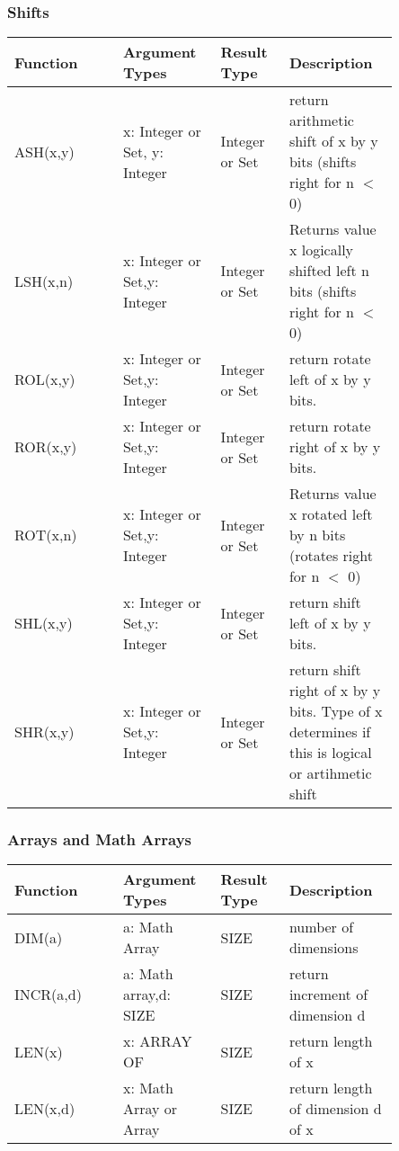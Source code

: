 \documentclass[a4wide,11pt]{article}
\begin{document}
\subsubsection{Shifts}
\begin{longtable}{|p{0.25\linewidth}|p{0.2\linewidth}|p{0.15\linewidth}|p{0.25\linewidth}|}
\hline
Function & Argument Types & Result Type & Description \\
\hline\hline
\endhead
ASH(x,y) & x: Integer or Set, y: Integer & Integer or Set & return arithmetic shift of x by y bits (shifts right for n $<$ 0)\\
LSH(x,n) & x: Integer or Set,\newline y: Integer & Integer or Set & Returns value x logically shifted left n bits (shifts right for n $<$ 0) \\
ROL(x,y) & x: Integer or Set,\newline y: Integer & Integer or Set & return rotate left of x by y bits. \\
ROR(x,y) & x: Integer or Set,\newline  y: Integer & Integer or Set & return rotate right of x by y bits. \\
ROT(x,n) & x: Integer or Set,\newline  y: Integer & Integer or Set & Returns value x rotated left by  n bits (rotates right for n $<$ 0) \\
SHL(x,y) & x: Integer or Set,\newline  y: Integer & Integer or Set & return shift left of x by y bits. \\
SHR(x,y) & x: Integer or Set,\newline  y: Integer & Integer or Set & return shift right of x by y bits. Type of x determines if this is logical or artihmetic shift\\
\hline
\end{longtable}

\subsubsection{Arrays and Math Arrays}
\begin{longtable}{|p{0.25\linewidth}|p{0.2\linewidth}|p{0.15\linewidth}|p{0.25\linewidth}|}
\hline
Function & Argument Types & Result Type & Description \\
\hline\hline
\endhead
DIM(a) & a: Math Array & SIZE & number of dimensions \\
INCR(a,d) & a: Math array,\newline  d: SIZE & SIZE & return increment of dimension d \\
LEN(x) & x: ARRAY OF & SIZE & return length of x\\
LEN(x,d) & x: Math Array or Array & SIZE & return length of dimension d of x\\
\hline
\end{longtable}
\end{document}
